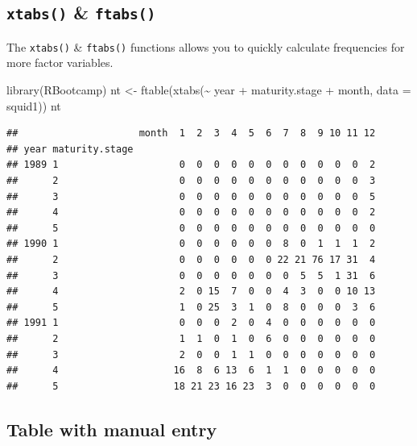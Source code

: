 \documentclass[
]{book}
\newenvironment{Shaded}{\begin{snugshade}}{\end{snugshade}}
\newcommand{\AttributeTok}[1]{\textcolor[rgb]{0.77,0.63,0.00}{#1}}
\newcommand{\FunctionTok}[1]{\textcolor[rgb]{0.00,0.00,0.00}{#1}}
\newcommand{\NormalTok}[1]{#1}
\newcommand{\OtherTok}[1]{\textcolor[rgb]{0.56,0.35,0.01}{#1}}
\newcommand{\SpecialCharTok}[1]{\textcolor[rgb]{0.00,0.00,0.00}{#1}}
\begin{document}
\hypertarget{xtabs-ftabs}{%
\subsection{\texorpdfstring{\texttt{xtabs()} \& \texttt{ftabs()}}{xtabs() \& ftabs()}}\label{xtabs-ftabs}}

The \texttt{xtabs()} \& \texttt{ftabs()} functions allows you to quickly calculate frequencies for more factor variables.

\begin{Shaded}
\begin{Highlighting}[]
\FunctionTok{library}\NormalTok{(RBootcamp)}
\NormalTok{nt }\OtherTok{\textless{}{-}} \FunctionTok{ftable}\NormalTok{(}\FunctionTok{xtabs}\NormalTok{(}\SpecialCharTok{\textasciitilde{}}\NormalTok{ year }\SpecialCharTok{+}\NormalTok{ maturity.stage }\SpecialCharTok{+}\NormalTok{ month, }\AttributeTok{data =}\NormalTok{ squid1))}
\NormalTok{nt}
\end{Highlighting}
\end{Shaded}

\begin{verbatim}
##                     month  1  2  3  4  5  6  7  8  9 10 11 12
## year maturity.stage                                          
## 1989 1                     0  0  0  0  0  0  0  0  0  0  0  2
##      2                     0  0  0  0  0  0  0  0  0  0  0  3
##      3                     0  0  0  0  0  0  0  0  0  0  0  5
##      4                     0  0  0  0  0  0  0  0  0  0  0  2
##      5                     0  0  0  0  0  0  0  0  0  0  0  0
## 1990 1                     0  0  0  0  0  0  8  0  1  1  1  2
##      2                     0  0  0  0  0  0 22 21 76 17 31  4
##      3                     0  0  0  0  0  0  0  5  5  1 31  6
##      4                     2  0 15  7  0  0  4  3  0  0 10 13
##      5                     1  0 25  3  1  0  8  0  0  0  3  6
## 1991 1                     0  0  0  2  0  4  0  0  0  0  0  0
##      2                     1  1  0  1  0  6  0  0  0  0  0  0
##      3                     2  0  0  1  1  0  0  0  0  0  0  0
##      4                    16  8  6 13  6  1  1  0  0  0  0  0
##      5                    18 21 23 16 23  3  0  0  0  0  0  0
\end{verbatim}

\hypertarget{table-with-manual-entry}{%
\subsection{Table with manual entry}\label{table-with-manual-entry}}
\end{document}

